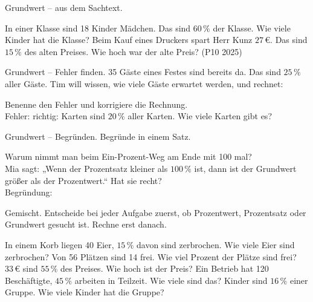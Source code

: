 \begin{aufgabe}{Grundwert – aus dem Sachtext.}
\begin{teile}
\teil In einer Klasse sind 18 Kinder Mädchen. Das sind $60\,\%$ der Klasse. Wie viele Kinder hat die Klasse? \leerfeld
\teil Beim Kauf eines Druckers spart Herr Kunz $27\,€$. Das sind $15\,\%$ des alten Preises. Wie hoch war der alte Preis? \hfill (P10 2025) \\ \leerfeld[€]
\end{teile}
\end{aufgabe}

\begin{aufgabe}{Grundwert – Fehler finden. 35 Gäste eines Festes sind bereits da. Das sind $25\,\%$ aller Gäste. Tim will wissen, wie viele Gäste erwartet werden, und rechnet:}
\begin{teile}
\teil Benenne den Fehler und korrigiere die Rechnung. \\ Fehler: \dsleer\dsleer\dsleer \quad richtig: \leerfeld
{} Karten sind $20\,\%$ aller Karten. Wie viele Karten gibt es? \leerfeld
\end{teile}
\end{aufgabe}

\begin{aufgabe}{Grundwert – Begründen. Begründe in einem Satz.}
\begin{teile}
\teil Warum nimmt man beim Ein-Prozent-Weg am Ende mit 100 mal? \\ \dsleer\dsleer\dsleer\dsleer
\teil Mia sagt: „Wenn der Prozentsatz kleiner als $100\,\%$ ist, dann ist der Grundwert größer als der Prozentwert.“ Hat sie recht? \janein \\ Begründung: \dsleer\dsleer\dsleer\dsleer
\end{teile}
\end{aufgabe}

\begin{aufgabe}{Gemischt. Entscheide bei jeder Aufgabe zuerst, ob Prozentwert, Prozentsatz oder Grundwert gesucht ist. Rechne erst danach.}
\begin{teile}
\teil In einem Korb liegen 40 Eier, $15\,\%$ davon sind zerbrochen. Wie viele Eier sind zerbrochen? \leerfeld
\teil Von 56 Plätzen sind 14 frei. Wie viel Prozent der Plätze sind frei? \leerfeld[\%]
\teil $33\,€$ sind $55\,\%$ des Preises. Wie hoch ist der Preis? \leerfeld[€]
\teil Ein Betrieb hat 120 Beschäftigte, $45\,\%$ arbeiten in Teilzeit. Wie viele sind das? \leerfeld
{} Kinder sind $16\,\%$ einer Gruppe. Wie viele Kinder hat die Gruppe? \leerfeld
\end{teile}
\end{aufgabe}
